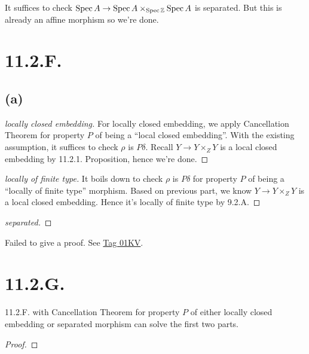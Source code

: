 It suffices to check $\operatorname{Spec} A\to \operatorname{Spec} A\times_{\operatorname{Spec} \mathbb Z} \operatorname{Spec} A$ is separated. But this is already an affine morphism so we're done.

\section{11.2.F.}

\subsection{(a)}

\begin{proof}[locally closed embedding]
    For locally closed embedding, we apply Cancellation Theorem for property $P$ of being a \enquote{local closed embedding}. With the existing assumption, it suffices to check $\rho$ is $P\delta$. Recall $Y\to Y\times_Z Y$ is a local closed embedding by 11.2.1. Proposition, hence we're done.
\end{proof}

\begin{proof}[locally of finite type]
    It boils down to check $\rho$ is $P\delta$ for property $P$ of being a \enquote{locally of finite type} morphism. Based on previous part, we know $Y\to Y\times_Z Y$ is a local closed embedding. Hence it's locally of finite type by 9.2.A.
\end{proof}

\begin{proof}[separated]

\end{proof}
Failed to give a proof. See \href{https://stacks.math.columbia.edu/tag/01KV}{Tag 01KV}. 

\section{11.2.G.}
    11.2.F. with Cancellation Theorem for property $P$ of either locally closed embedding or separated morphism can solve the first two parts.
\begin{proof} 
    
\end{proof}